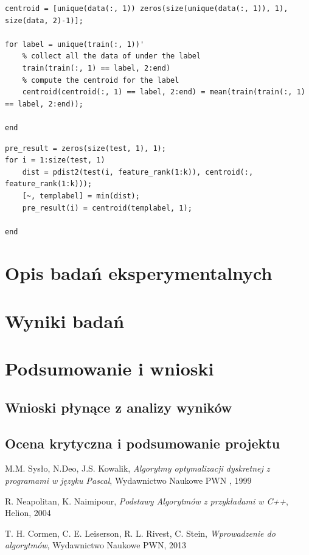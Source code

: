 \documentclass[11pt, a4paper, titlepage]{report}
\begin{document}
\begin{lstlisting}[label={lst:centroidy},caption={Etap treningu - wyznaczanie centroidów.}]
centroid = [unique(data(:, 1)) zeros(size(unique(data(:, 1)), 1), size(data, 2)-1)];

for label = unique(train(:, 1))'
    % collect all the data of under the label
    train(train(:, 1) == label, 2:end)
    % compute the centroid for the label
    centroid(centroid(:, 1) == label, 2:end) = mean(train(train(:, 1) == label, 2:end));

end
\end{lstlisting}

\begin{lstlisting}[label={lst:pre_result},caption={Wyznaczenie odległości próbki od centroida i przydzielenie do klasy.}]
pre_result = zeros(size(test, 1), 1);
for i = 1:size(test, 1)
    dist = pdist2(test(i, feature_rank(1:k)), centroid(:, feature_rank(1:k)));
    [~, templabel] = min(dist);
    pre_result(i) = centroid(templabel, 1);

end
\end{lstlisting}

\chapter{Opis badań eksperymentalnych}
\label{chap:Opis badań eksperymentalnych}

\chapter{Wyniki badań}
\label{chap:Wyniki badań}

\chapter{Podsumowanie i wnioski}
\label{chap:Podsumowanie i wnioski}
\section{Wnioski płynące z analizy wyników}
\section{Ocena krytyczna i podsumowanie projektu}

\begin{thebibliography}{}
M.M. Sysło, N.Deo, J.S. Kowalik, \textit{Algorytmy optymalizacji dyskretnej z programami w języku Pascal}, Wydawnictwo Naukowe PWN , 1999

R. Neapolitan, K. Naimipour, \textit{Podstawy Algorytmów z przykładami w C++}, Helion, 2004

T. H. Cormen, C. E. Leiserson, R. L. Rivest, C. Stein, \textit{Wprowadzenie do algorytmów}, Wydawnictwo Naukowe PWN, 2013

\end{thebibliography}
\end{document}
